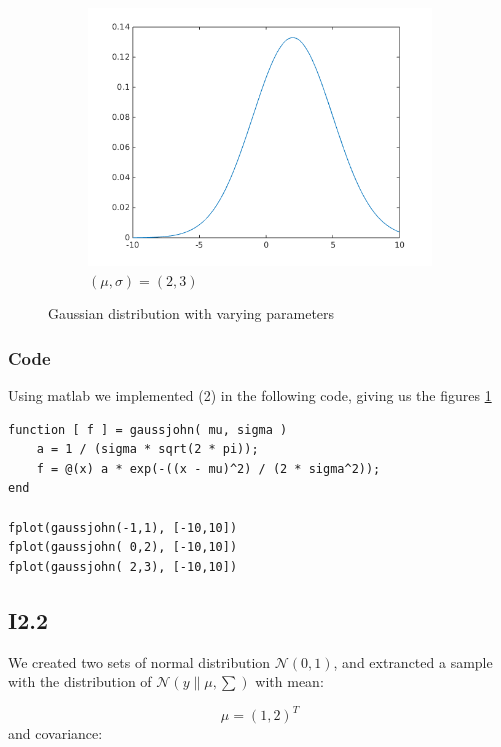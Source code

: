 \documentclass{article}
\begin{document}
\begin{figure}[!ht]
\begin{subfigure}[b]{0.4\textwidth}
        \includegraphics[width=\textwidth]{part1/I213.png}
        \caption{$(\mu, \sigma) = (2,3)$}
    \end{subfigure}
    \caption{Gaussian distribution with varying parameters}
    \label{fig:I1.1}
\end{figure}

\subsubsection{Code}
Using matlab we implemented (2) in the following code, giving us the figures \ref{fig:I1.1}

\begin{verbatim}
function [ f ] = gaussjohn( mu, sigma )
    a = 1 / (sigma * sqrt(2 * pi));
    f = @(x) a * exp(-((x - mu)^2) / (2 * sigma^2));
end

fplot(gaussjohn(-1,1), [-10,10])
fplot(gaussjohn( 0,2), [-10,10])
fplot(gaussjohn( 2,3), [-10,10])
\end{verbatim}

\subsection{I2.2}

We created two sets of normal distribution $\mathscr{N}(0,1)$, and extrancted a sample with the distribution of $\mathscr{N}(y \| \mu, \sum)$ 
with mean:

\begin{equation}\label{eq:2.2mean}
    \mu = (1,2)^T
\end{equation} 
and covariance:
\end{document}
